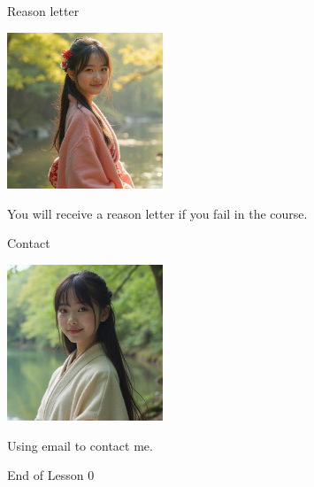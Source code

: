 \documentclass{beamer}
\begin{document}
\begin{frame}{Reason letter}
\begin{center}
\includegraphics[width=0.35\textwidth]{endeavor.png}
\end{center}
\begin{center}
You will receive a reason letter if you fail in the course.
\end{center}
\end{frame}
\begin{frame}{Contact}
\begin{center}
\includegraphics[width=0.35\textwidth]{kg.png}
\end{center}
\begin{center}
Using email to contact me.
\end{center}
\end{frame}
\begin{frame}{}
\begin{center}
\Large{End of Lesson 0}
\end{center}
\end{frame}
\end{document}
